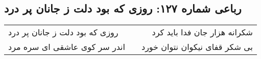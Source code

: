 \begin{center}
\section*{رباعی شماره ۱۲۷: روزی که بود دلت ز جانان پر درد}
\label{sec:sh127}
\begin{longtable}{l p{0.5cm} r}
روزی که بود دلت ز جانان پر درد
&&
شکرانه هزار جان فدا باید کرد
\\
اندر سر کوی عاشقی ای سره مرد
&&
بی شکر قفای نیکوان نتوان خورد
\\
\end{longtable}
\end{center}
